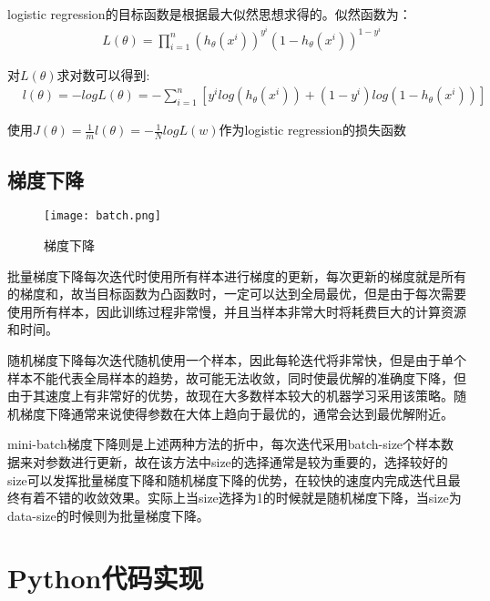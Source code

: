 \documentclass[lang=cn,12pt,a4paper,cite=authoryear]{elegantpaper}
\begin{document}
logistic regression的目标函数是根据最大似然思想求得的。似然函数为：
\begin{equation}
	\begin{aligned}
		&L(\theta)=\prod_{i=1}^{n}(h_{\theta}(x^{i}))^{y^{i}}(1-h_{\theta}(x^{i}))^{1-y^{i}}
	\end{aligned}
\end{equation}


对$L(\theta)$求对数可以得到:
\begin{equation}
	\begin{aligned}
		&l(\theta)=-logL(\theta)=-\sum_{i=1}^{n}[{y^{i}}log(h_{\theta}(x^{i}))+(1-y^{i})log(1-h_{\theta}(x^{i}))]
	\end{aligned}
\end{equation}

使用$J(\theta)=\frac{1}{m}l(\theta)=-\frac{1}{N}logL(w) $作为logistic regression的损失函数


\subsection{梯度下降}

\begin{figure}[htbp]
	\centering
	\texttt{[image: batch.png]}
	\caption{梯度下降}
\end{figure}

批量梯度下降每次迭代时使用所有样本进行梯度的更新，每次更新的梯度就是所有的梯度和，故当目标函数为凸函数时，一定可以达到全局最优，但是由于每次需要使用所有样本，因此训练过程非常慢，并且当样本非常大时将耗费巨大的计算资源和时间。


随机梯度下降每次迭代随机使用一个样本，因此每轮迭代将非常快，但是由于单个样本不能代表全局样本的趋势，故可能无法收敛，同时使最优解的准确度下降，但由于其速度上有非常好的优势，故现在大多数样本较大的机器学习采用该策略。随机梯度下降通常来说使得参数在大体上趋向于最优的，通常会达到最优解附近。


mini-batch梯度下降则是上述两种方法的折中，每次迭代采用batch-size个样本数据来对参数进行更新，故在该方法中size的选择通常是较为重要的，选择较好的size可以发挥批量梯度下降和随机梯度下降的优势，在较快的速度内完成迭代且最终有着不错的收敛效果。实际上当size选择为1的时候就是随机梯度下降，当size为data-size的时候则为批量梯度下降。


\section{Python代码实现}
\end{document}
